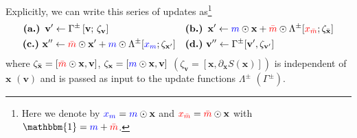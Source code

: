 \documentclass[a4paper,11pt]{article}
\newcommand{\x}{\mathbf{x}}
\newcommand{\p}{\mathbf{v}}
\newcommand{\mask}{\textcolor{blue}{{m}}}
\newcommand{\maskbar}{\textcolor{red}{\bar{m}}}
\newcommand{\xmask}{\textcolor{blue}{{x}_{m}}}
\newcommand{\xmaskbar}{\textcolor{red}{x_{\bar{m}}}}
\begin{document}
Explicitly, we can write this series of updates as\footnote{%
  Here we denote by \(\xmask = \mask \odot \x\) and 
  \(\xmaskbar = \maskbar \odot \x\) with \(\mathbbm{1} = \mask + \maskbar\).
}
%
\begin{align}
    \nonumber
    \textbf{(a.)}\,\,\, \p'
        \gets \Gamma^{\pm}\left[\p;\, \zeta_{\p} \right]\hspace{80pt}
    &\textbf{(b.)}\,\,\, \x'
        \gets \mask \odot \x + \maskbar \odot \Lambda^{\pm} [\xmaskbar; \zeta_{\bar{\x}}] \\
    \nonumber
    \textbf{(c.)}\,\, \x''
        \gets \maskbar \odot \x' + \mask \odot \Lambda^{\pm} [\xmask; \zeta_{\x'}] \quad
    &\textbf{(d.)}\,\, \p''
        \gets \Gamma^{\pm} [\p', \zeta_{\p'}]
\end{align}
%
where \(\zeta_{\bar{\x}} = [\maskbar\odot \x, \p]\), \(\zeta_{\x} = [\mask \odot \x,
\p]\) \((\zeta_{\p} = [\x, \partial_{\x} S(\x)])\) is independent of \(\x\) \((\p)\)
and is passed as input to the update functions \(\Lambda^{\pm}\)
\((\Gamma^{\pm})\).
%
\end{document}
